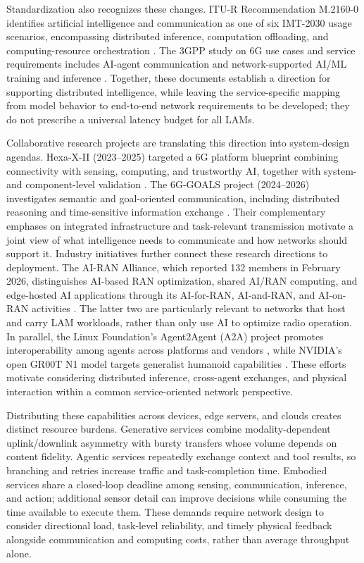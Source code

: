 \documentclass[letterpaper,journal]{IEEEtran}
\begin{document}
Standardization also recognizes these changes. ITU-R Recommendation
M.2160-0 identifies artificial intelligence and communication as one of
six IMT-2030 usage scenarios, encompassing distributed inference,
computation offloading, and computing-resource orchestration
\cite{itu2160}. The 3GPP study on 6G use cases and service requirements
includes AI-agent communication and network-supported AI/ML training and
inference \cite{3gpp22870}. Together, these documents establish a direction
for supporting distributed intelligence, while leaving the service-specific
mapping from model behavior to end-to-end network requirements to be
developed; they do not prescribe a universal latency budget for all LAMs.

Collaborative research projects are translating this direction into
system-design agendas. Hexa-X-II (2023--2025) targeted a 6G platform
blueprint combining connectivity with sensing, computing, and trustworthy
AI, together with system- and component-level validation
\cite{hexaxii}. The 6G-GOALS project (2024--2026) investigates semantic and
goal-oriented communication, including distributed reasoning and
time-sensitive information exchange \cite{6ggoals}. Their complementary
emphases on integrated infrastructure and task-relevant transmission
motivate a joint view of what intelligence needs to communicate and how
networks should support it. Industry initiatives further connect these research directions to
deployment. The AI-RAN Alliance, which reported 132 members in February
2026, distinguishes AI-based RAN optimization, shared AI/RAN computing,
and edge-hosted AI applications through its AI-for-RAN, AI-and-RAN, and
AI-on-RAN activities \cite{airan2026}. The latter two are particularly
relevant to networks that host and carry LAM workloads, rather than only
use AI to optimize radio operation. In parallel, the Linux Foundation's
Agent2Agent (A2A) project promotes interoperability among agents across
platforms and vendors \cite{a2aproject}, while NVIDIA's open GR00T N1
model targets generalist humanoid capabilities \cite{groot}. These efforts
motivate considering distributed inference, cross-agent exchanges, and
physical interaction within a common service-oriented network perspective.

Distributing these capabilities across devices, edge servers, and clouds
creates distinct resource burdens.
Generative services combine modality-dependent uplink/downlink asymmetry
with bursty transfers whose volume depends on content fidelity. Agentic
services repeatedly exchange context and tool results, so branching and
retries increase traffic and task-completion time. Embodied services share
a closed-loop deadline among sensing, communication, inference, and action;
additional sensor detail can improve decisions while consuming the time
available to execute them. These demands require network design to consider
directional load, task-level reliability, and timely physical feedback
alongside communication and computing costs, rather than average throughput
alone.
\end{document}
